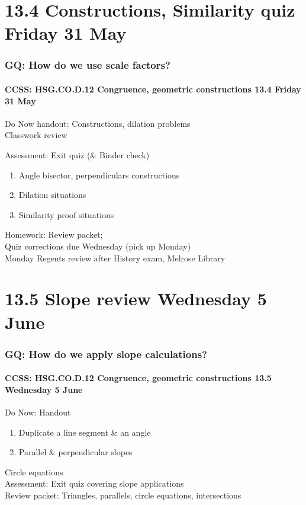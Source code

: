 \documentclass{beamer}
\begin{document}
\section{13.4 Constructions, Similarity quiz Friday 31 May}
  \frame
  {
    \frametitle{GQ: How do we use scale factors?}
    \framesubtitle{CCSS: HSG.CO.D.12 Congruence, geometric constructions \hfill \alert{13.4 Friday 31 May}}

    Do Now handout: Constructions, dilation problems\\
    Classwork review
    \begin{block}{Assessment: Exit quiz (\& Binder check)}
      \begin{enumerate}
        \item Angle bisector, perpendiculars constructions
        \item Dilation situations
        \item Similarity proof situations
    \end{enumerate}
    \end{block}
    Homework: Review packet; \\
    Quiz corrections due Wednesday (pick up Monday)\\
    \alert{Monday Regents review after History exam, Melrose Library}
  }

  \section{13.5 Slope review Wednesday 5 June}
    \frame
    {
      \frametitle{GQ: How do we apply slope calculations?}
      \framesubtitle{CCSS: HSG.CO.D.12 Congruence, geometric constructions \hfill \alert{13.5 Wednesday 5 June}}

      \begin{block}{Do Now: Handout}
        \begin{enumerate}
          \item Duplicate a line segment \& an angle
          \item Parallel \& perpendicular slopes
        \end{enumerate}
      \end{block}
      Circle equations\\[0.5cm]
      Assessment: Exit quiz covering slope applications\\
      Review packet: Triangles, parallels, circle equations, intersections
    }
\end{document}
